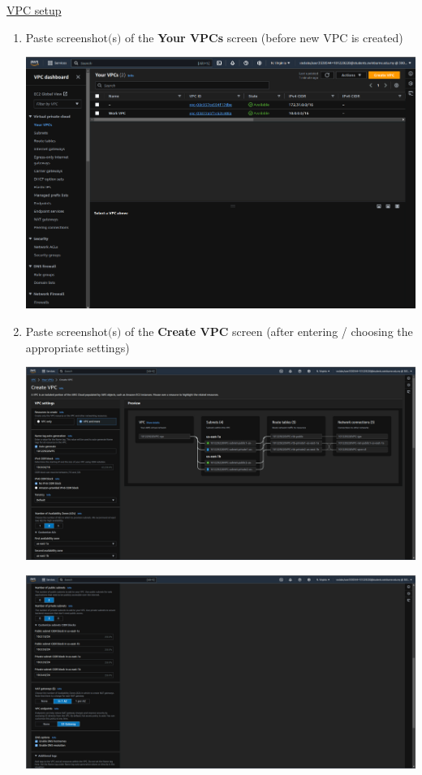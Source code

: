 \documentclass[11pt]{article}
\begin{document}
\vspace{1.5cm}

\newpage

\noindent\underline{VPC setup}

\begin{enumerate}
    \item Paste screenshot$($s$)$ of the \textbf{Your VPCs} screen (before new VPC is created) \\
    \vspace{5mm}
    
    
    {\centering
    \includegraphics[width=5.8in]{pics/1a.png}
    }
    
    \item Paste screenshot$($s$)$ of the \textbf{Create VPC} screen (after entering / choosing the appropriate settings) \\
    \vspace{5mm}

    {\centering
    \includegraphics[width=5.8in]{pics/2a.png}
    }


    {\centering
    \includegraphics[width=5.8in]{pics/2b.png}
    }



\end{enumerate}
\end{document}
